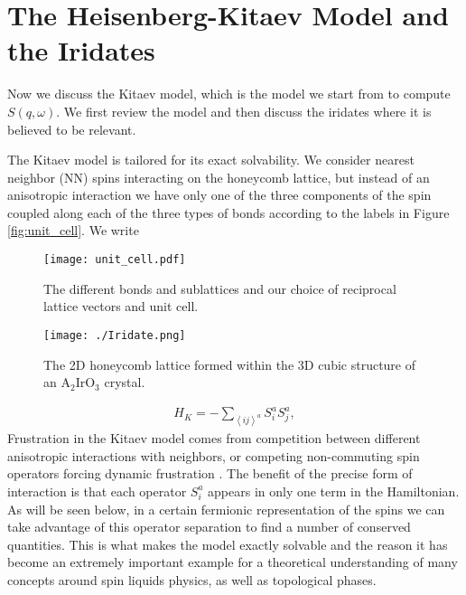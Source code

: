 \documentclass[aps,pra,preprint,groupedaddress]{revtex4-1}
\newcommand{\1}{\mathds{1}}
\begin{document}
\section{The Heisenberg-Kitaev Model and the Iridates}



Now we discuss the Kitaev model, which is the model we start from to compute $S(q,\omega)$. We first review the model and then discuss the iridates where it is believed to be relevant.

The Kitaev model is tailored for its exact solvability. %
We consider nearest neighbor (NN) spins interacting on the honeycomb lattice, but instead of an anisotropic interaction we have only one of the three components of the spin coupled along each of the three types of bonds according to the labels in Figure \ref{fig:unit_cell}. We write 

\begin{figure}
	\centering
	\begin{minipage}{.49\textwidth}
		\centering
		\texttt{[image: unit\_cell.pdf]}
		\caption{The different bonds and sublattices and our choice of reciprocal lattice vectors and unit cell.}
		\label{fig:unit_cell}
	\end{minipage} %
	\begin{minipage}{.49\textwidth}
		\centering
		\texttt{[image: ./Iridate.png]}
		\caption{The 2D honeycomb lattice formed within the 3D cubic structure of an A$_2$IrO$_3$ crystal.}
		\label{fig:Iridate}
	\end{minipage}
\end{figure}

\begin{align}\label{Kitaev}
H_K = -\sum_{\left<ij\right>^a} S_i^a S_j^a,
\end{align}
Frustration in the Kitaev model comes from competition between different anisotropic interactions with neighbors, or competing non-commuting spin operators forcing dynamic frustration \cite{Kimchi}. The benefit of the precise form of interaction is that each operator $S^a_i$ appears in only one term in the Hamiltonian. As will be seen below, in a certain fermionic representation of the spins we can take advantage of this operator separation to find a number of conserved quantities. This is what makes the model exactly solvable and the reason it has become an extremely important example for a theoretical understanding of  many concepts around spin liquids physics, as well as topological phases. %
\end{document}

